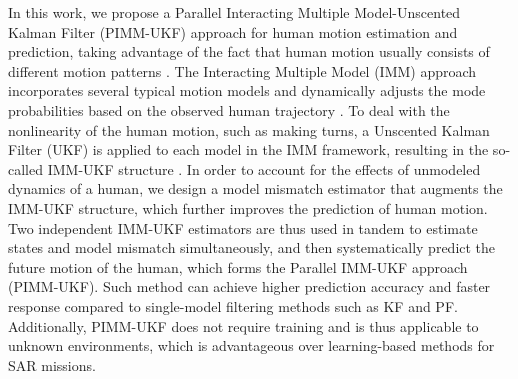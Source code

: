 \documentclass[journal]{IEEEtran}
\newcommand{\todohere}[1]{\hl{(\textbf{TODO:} #1)}}
\DeclareRobustCommand{\clnote}[1]{\ifthenelse{\boolean{include-notes}}%
{\textcolor{orange}{\textbf{CL: #1}}}{}}
\DeclareRobustCommand{\dhnote}[1]{\ifthenelse{\boolean{include-notes}}%
{\textcolor{blue}{\textbf{DH: #1}}}{}}
\DeclareRobustCommand{\grnote}[1]{\ifthenelse{\boolean{include-notes}}%
{\textcolor{purple}{\textbf{GR: #1}}}{}}
\begin{document}
In this work, we propose a Parallel Interacting Multiple Model-Unscented Kalman Filter (PIMM-UKF) approach for human motion estimation and prediction, taking advantage of the fact that human motion usually consists of different motion patterns \cite{aggarwal1999human}. %
	The Interacting Multiple Model (IMM) approach incorporates several typical motion models and dynamically adjusts the mode probabilities based on the observed human trajectory \cite{yaakov2001estimation}.
	To deal with the nonlinearity of the human motion, such as making turns, a Unscented Kalman Filter (UKF) is applied to each model in the IMM framework, resulting in the so-called IMM-UKF structure \cite{lee2015interacting}.
In order to account for the effects of unmodeled dynamics of a human, we design a model mismatch estimator that augments the IMM-UKF structure, which further improves the prediction of human motion. 
Two independent IMM-UKF estimators are thus 
used in tandem
to estimate states and model mismatch simultaneously, and then systematically predict the future motion of the human, which forms the Parallel IMM-UKF approach (PIMM-UKF).
Such method can achieve higher prediction accuracy and faster response compared to single-model filtering methods such as KF and PF. 
	Additionally, PIMM-UKF does not require training and is thus applicable to unknown environments, which is advantageous over learning-based methods for SAR missions.
    
\end{document}
